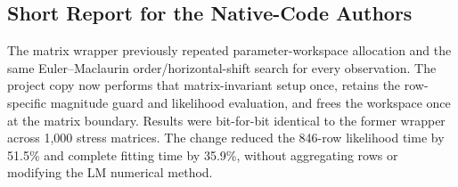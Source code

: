 \documentclass[11pt,a4paper]{article}
\begin{document}
\subsection{Short Report for the Native-Code Authors}

The matrix wrapper previously repeated parameter-workspace allocation and the
same Euler--Maclaurin order/horizontal-shift search for every observation. The
project copy now performs that matrix-invariant setup once, retains the
row-specific magnitude guard and likelihood evaluation, and frees the
workspace once at the matrix boundary. Results were bit-for-bit identical to
the former wrapper across 1,000 stress matrices. The change reduced the
846-row likelihood time by 51.5\% and complete fitting time by 35.9\%, without
aggregating rows or modifying the LM numerical method.
\end{document}
